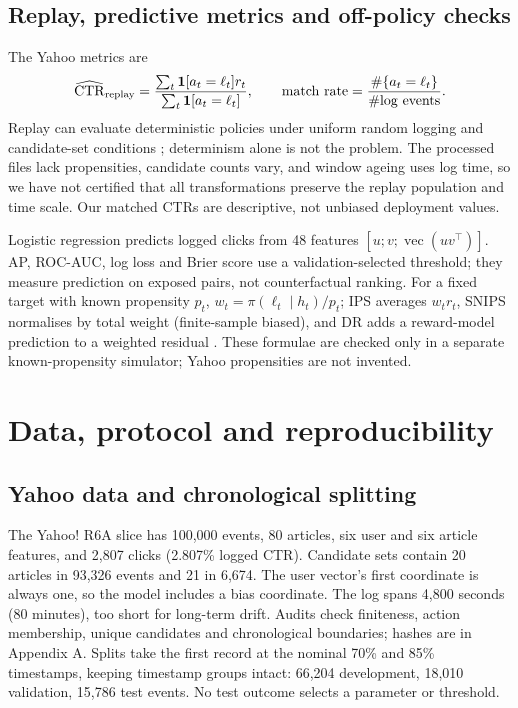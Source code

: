 \documentclass[10pt,a4paper]{article}
\begin{document}
\subsection{Replay, predictive metrics and off-policy checks}
The Yahoo metrics are
\[
\widehat{\mathrm{CTR}}_{\rm replay}=
\frac{\sum_t\mathbf1[a_t=\ell_t]r_t}{\sum_t\mathbf1[a_t=\ell_t]},
\qquad \mathrm{match\ rate}=\frac{\#\{a_t=\ell_t\}}{\#\mathrm{log\ events}}.
\]
Replay can evaluate deterministic policies under uniform random logging
and candidate-set conditions \cite{li2011}; determinism alone is not the
problem. The processed files lack propensities, candidate counts vary, and
window ageing uses log time, so we have not certified that all
transformations preserve the replay population and time scale. Our
matched CTRs are descriptive, not unbiased deployment values.

Logistic regression predicts logged clicks from 48 features
$[u;v;\operatorname{vec}(uv^\top)]$. AP, ROC-AUC, log loss and Brier score
use a validation-selected threshold; they measure prediction on exposed
pairs, not counterfactual ranking. For a fixed target with known
propensity $p_t$, $w_t=\pi(\ell_t\mid h_t)/p_t$; IPS averages $w_tr_t$,
SNIPS normalises by total weight (finite-sample biased), and DR adds a
reward-model prediction to a weighted residual \cite{dudik2011}. These
formulae are checked only in a separate known-propensity simulator; Yahoo
propensities are not invented.

\section{Data, protocol and reproducibility}
\subsection{Yahoo data and chronological splitting}
The Yahoo! R6A slice has 100,000 events, 80 articles, six user and six
article features, and 2,807 clicks (2.807\% logged CTR). Candidate sets
contain 20 articles in 93,326 events and 21 in 6,674. The user vector's
first coordinate is always one, so the model includes a bias coordinate.
The log spans 4,800 seconds (80 minutes), too short for long-term drift.
Audits check finiteness, action membership, unique candidates and
chronological boundaries; hashes are in Appendix A. Splits take the first
record at the nominal 70\% and 85\% timestamps, keeping timestamp groups
intact: 66,204 development, 18,010 validation, 15,786 test events. No
test outcome selects a parameter or threshold.
\end{document}
